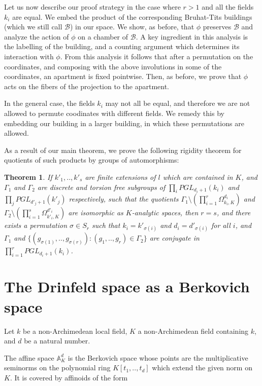 \documentclass{amsart}
\theoremstyle{theorem}
\newtheorem{theorem}{Theorem}
\theoremstyle{lemma}
\theoremstyle{prop}
\theoremstyle{definition}
\theoremstyle{corollary}
\theoremstyle{remark}
\newcommand{\A}{\mathbb{A}}
\newcommand{\B}{\mathcal{B}}
\begin{document}
Let us now describe our proof strategy in the case where $r>1$ and all the fields $k_i$ are equal. We embed the product of the corresponding Bruhat-Tits buildings (which we still call $\B$) in our space. We show, as before, that $\phi$ preserves $\B$ and analyze the action of $\phi$ on a chamber of $\B$. A key ingredient in this analysis is the labelling of the building, and a counting argument which determines its interaction with $\phi$. From this analysis it follows that after a permutation on the coordinates, and composing with the above involutions in some of the coordinates, an apartment is fixed pointwise. Then, as before, we prove that $\phi$ acts on the fibers of the projection to the apartment. 

In the general case, the fields $k_i$ may not all be equal, and therefore we are not allowed to permute coodinates with different fields. We remedy this by embedding our building in a larger building, in which these permutations are allowed.

As a result of our main theorem, we prove the following rigidity theorem for quotients of such products by groups of automorphisms:
\begin{theorem} \label{R} If $k'_1,..,k'_s$ are finite extensions of $l$ which are contained in $K$, and $\Gamma_1$ and $\Gamma_2$ are discrete and torsion free subgroups of $\prod_i PGL_{d_i+1}(k_i)$ and $\prod_j PGL_{d'_j+1}(k'_j)$ respectively, such that the quotients $\Gamma_1 \setminus (\prod_{i=1}^r\Omega_{k_i,K}^{d_i})$ and  $\Gamma_2 \setminus (\prod_{i=1}^s\Omega_{k'_i,K}^{d'_i})$ are isomorphic as $K$-analytic spaces, then $r=s$, and there exists a permutation $\sigma \in S_r$ such that $k_i=k'_{\sigma(i)}$ and $d_i=d'_{\sigma(i)}$ for all $i$, and $\Gamma_1$ and $\{(g_{\sigma(1)},..,g_{\sigma(r)}):(g_1,..,g_r)\in \Gamma_2\}$ are conjugate in $\prod_{i=1}^rPGL_{d_i+1}(k_i)$. \end{theorem}



\section{The Drinfeld space as a Berkovich space} \label{sec:DrSp}

Let $k$ be a non-Archimedean local field, $K$ a non-Archimedean field containing $k$, and $d$ be a natural number.

The affine space $\A^{d}_{K}$ is the Berkovich space whose points are the multiplicative seminorms on the polynomial ring $K[t_1,..,t_{d}]$ which extend the given norm on $K$. It is covered by affinoids of the form 
\end{document}
